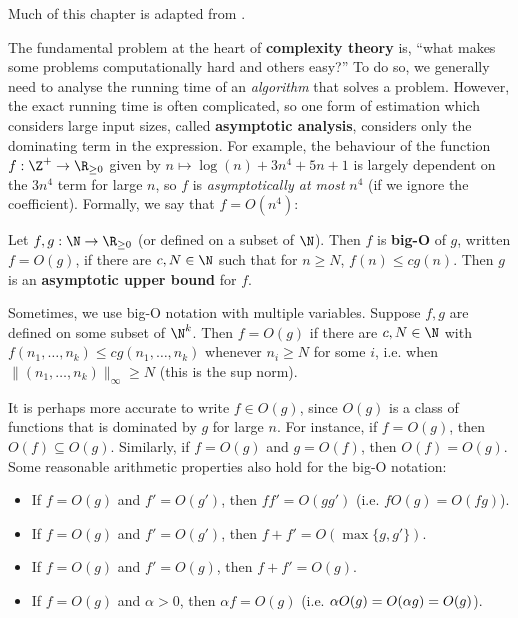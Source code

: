 Much of this chapter is adapted from \cite{sipser_intro_theory_comp2013}.

The fundamental problem at the heart of \textbf{complexity theory} is, ``what makes some problems computationally hard and others easy?'' To do so, we generally need to analyse the running time of an \textit{algorithm} that solves a problem. However, the exact running time is often complicated, so one form of estimation which considers large input sizes, called \textbf{asymptotic analysis}, considers only the dominating term in the expression. For example, the behaviour of the function $f : \Z^+ \to \R_{\geq 0}$ given by $n \mapsto \log(n) + 3n^4 + 5n + 1$ is largely dependent on the $3n^4$ term for large $n$, so $f$ is \textit{asymptotically at most} $n^4$ (if we ignore the coefficient). Formally, we say that $f = O(n^4)$:

\begin{definition}\label{def:big_O_notation}
  Let $f,g : \N \to \R_{\geq 0}$ (or defined on a subset of $\N$). Then $f$ is \textbf{big-O} of $g$, written $f = O(g)$, if there are $c,N \in \N$ such that for $n \geq N$, $f(n) \leq cg(n)$. Then $g$ is an \textbf{asymptotic upper bound} for $f$. %
\end{definition}

Sometimes, we use big-O notation with multiple variables. Suppose $f,g$ are defined on some subset of $\N^k$. Then $f = O(g)$ if there are $c,N \in \N$ with $f(n_1,\dotsc,n_k) \leq cg(n_1,\dotsc,n_k)$ whenever $n_i \geq N$ for some $i$, i.e. when $\|(n_1,\dotsc,n_k)\|_\infty \geq N$ (this is the sup norm).

It is perhaps more accurate to write $f \in O(g)$, since $O(g)$ is a class of functions that is dominated by $g$ for large $n$. For instance, if $f = O(g)$, then $O(f) \subseteq O(g)$. Similarly, if $f = O(g)$ and $g = O(f)$, then $O(f) = O(g)$. Some reasonable arithmetic properties also hold for the big-O notation:

\begin{itemize}
  \item If $f = O(g)$ and $f' = O(g')$, then $ff' = O(gg')$ (i.e. $f O(g) = O(fg)$).
  \item If $f = O(g)$ and $f' = O(g')$, then $f + f' = O(\max\{g,g'\})$.
  \item If $f = O(g)$ and $f' = O(g)$, then $f + f' = O(g)$.
  \item If $f = O(g)$ and $\alpha > 0$, then $\alpha f = O(g)$ (i.e. $\alpha O(g) = \added{1}{O(\alpha g)} = O(g)$).
\end{itemize}


